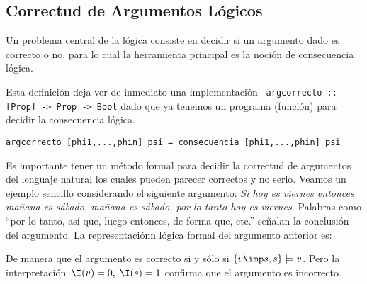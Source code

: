 \documentclass[11pt,letterpaper]{article}
\begin{document}
\subsection{Correctud de Argumentos L\'ogicos}

Un problema central de la l\'ogica consiste en decidir si un argumento dado es
correcto o no, para lo cual la herramienta principal es la noci\'on de
consecuencia l\'ogica.


\noindent Esta definici\'on deja ver de inmediato una implementaci\'on 
\verb~ argcorrecto :: [Prop] -> Prop -> Bool~
dado que ya tenemos un programa (funci\'on) para decidir la consecuencia 
l\'ogica.
\begin{verbatim}
argcorrecto [phi1,...,phin] psi = consecuencia [phi1,...,phin] psi
\end{verbatim}

Es importante tener un m\'etodo formal para decidir la correctud de argumentos
del lenguaje natural los cuales pueden parecer correctos y no serlo. Veamos
un ejemplo sencillo considerando el siguiente argumento: 
\bc
\emph{Si hoy es viernes entonces ma\~nana es s\'abado, ma\~nana es s\'abado, 
por lo tanto hoy es viernes.}
\ec
\noindent
Palabras como \enquote{por lo tanto, as\'i que, luego entonces, de forma que, 
etc.} se\~nalan la conclusi\'on del argumento.
La representaci\'onn l\'ogica formal del argumento anterior es:
\begin{mathpar}
\end{mathpar}
\noindent
De manera que el argumento es correcto si y s\'olo si $\{v\imp s,s\}\models v$.
Pero la interpretaci\'on~$\I(v)=0, \;\I(s)=1$ confirma que el argumento 
es incorrecto.\\
\end{document}
